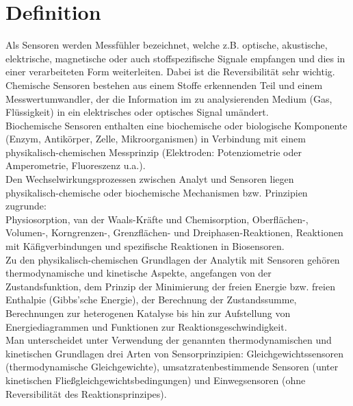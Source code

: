 \section{Definition}
Als Sensoren werden Messfühler bezeichnet, welche z.B. optische, akustische, elektrische, magnetische oder auch stoffspezifische Signale empfangen und dies in einer verarbeiteten Form weiterleiten. Dabei ist die Reversibilität sehr wichtig.
\\Chemische Sensoren bestehen aus einem Stoffe erkennenden Teil und einem Messwertumwandler, der die Information im zu analysierenden Medium (Gas, Flüssigkeit) in ein elektrisches oder optisches Signal umändert.
\\Biochemische Sensoren enthalten eine biochemische oder biologische Komponente (Enzym, Antikörper, Zelle, Mikroorganismen) in Verbindung mit einem physikalisch-chemischen Messprinzip (Elektroden: Potenziometrie oder Amperometrie, Fluoreszenz u.a.).
\\Den Wechselwirkungsprozessen zwischen Analyt und Sensoren liegen physikalisch-chemische oder biochemische Mechanismen bzw. Prinzipien zugrunde:
\\Physiosorption, van der Waals-Kräfte und Chemisorption, Oberflächen-, Volumen-, Korngrenzen-, Grenzflächen- und Dreiphasen-Reaktionen, Reaktionen mit Käfigverbindungen und spezifische Reaktionen in Biosensoren.
\\Zu den physikalisch-chemischen Grundlagen der Analytik mit Sensoren gehören thermodynamische und kinetische Aspekte, angefangen von der Zustandsfunktion, dem Prinzip der Minimierung der freien Energie bzw. freien Enthalpie (Gibbs'sche Energie), der Berechnung der Zustandssumme, Berechnungen zur heterogenen Katalyse bis hin zur Aufstellung von Energiediagrammen und Funktionen zur Reaktionsgeschwindigkeit.
\\Man unterscheidet unter Verwendung der genannten thermodynamischen und kinetischen Grundlagen drei Arten von Sensorprinzipien: Gleichgewichtssensoren (thermodynamische Gleichgewichte), umsatzratenbestimmende Sensoren (unter kinetischen Fließgleichgewichtsbedingungen) und Einwegsensoren (ohne Reversibilität des Reaktionsprinzipes). \cite{[5]} %
